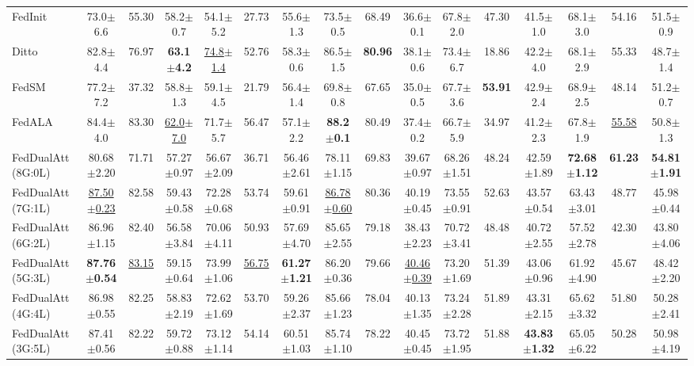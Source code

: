 \documentclass[a4paper]{article}
\begin{document}
\begin{table}[htbp]
\begin{adjustbox}{max width=\linewidth}
\begin{tabular}{l|ccc|ccc|ccc|ccc|ccc}
    FedInit & 73.0$\pm$6.6 & 55.30 & 58.2$\pm$0.7 & 54.1$\pm$5.2 & 27.73 & 55.6$\pm$1.3 & 73.5$\pm$0.5 & 68.49 & 36.6$\pm$0.1 & 67.8$\pm$2.0 & 47.30 & 41.5$\pm$1.0 & 68.1$\pm$3.0 & 54.16 & 51.5$\pm$0.9 \\
    Ditto   & 82.8$\pm$4.4 & 76.97 & \textbf{63.1$\pm$4.2} & \underline{74.8$\pm$1.4} & 52.76 & 58.3$\pm$0.6 & 86.5$\pm$1.5 & \textbf{80.96} & 38.1$\pm$0.6 & 73.4$\pm$6.7 & 18.86 & 42.2$\pm$4.0 & 68.1$\pm$2.9 & 55.33 & 48.7$\pm$1.4 \\
    FedSM   & 77.2$\pm$7.2 & 37.32 & 58.8$\pm$1.3 & 59.1$\pm$4.5 & 21.79 & 56.4$\pm$1.4 & 69.8$\pm$0.8 & 67.65 & 35.0$\pm$0.5 & 67.7$\pm$3.6 & \textbf{53.91} & 42.9$\pm$2.4 & 68.9$\pm$2.5 & 48.14 & 51.2$\pm$0.7 \\
    FedALA  & 84.4$\pm$4.0 & 83.30 & \underline{62.0$\pm$7.0} & 71.7$\pm$5.7 & 56.47 & 57.1$\pm$2.2 & \textbf{88.2$\pm$0.1} & 80.49 & 37.4$\pm$0.2 & 66.7$\pm$5.9 & 34.97 & 41.2$\pm$2.3 & 67.8$\pm$1.9 & \underline{55.58} & 50.8$\pm$1.3 \\
    \midrule
    FedDualAtt (8G:0L) & 80.68$\pm$2.20 & 71.71 & 57.27$\pm$0.97 & 56.67$\pm$2.09 & 36.71 & 56.46$\pm$2.61 & 78.11$\pm$1.15 & 69.83 & 39.67$\pm$0.97 & 68.26$\pm$1.51 & 48.24 & 42.59$\pm$1.89 & \textbf{72.68$\pm$1.12} & \textbf{61.23} & \textbf{54.81$\pm$1.91} \\
    FedDualAtt (7G:1L) & \underline{87.50$\pm$0.23} & 82.58 & 59.43$\pm$0.58 & 72.28$\pm$0.68 & 53.74 & 59.61$\pm$0.91 & \underline{86.78$\pm$0.60} & 80.36 & 40.19$\pm$0.45 & 73.55$\pm$0.91 & 52.63 & 43.57$\pm$0.54 & 63.43$\pm$3.01 & 48.77 & 45.98$\pm$0.44 \\
    FedDualAtt (6G:2L) & 86.96$\pm$1.15 & 82.40 & 56.58$\pm$3.84 & 70.06$\pm$4.11 & 50.93 & 57.69$\pm$4.70 & 85.65$\pm$2.55 & 79.18 & 38.43$\pm$2.23 & 70.72$\pm$3.41 & 48.48 & 40.72$\pm$2.55 & 57.52$\pm$2.78 & 42.30 & 43.80$\pm$4.06 \\
    FedDualAtt (5G:3L) & \textbf{87.76$\pm$0.54} & \underline{83.15} & 59.15$\pm$0.64 & 73.99$\pm$1.06 & \underline{56.75} & \textbf{61.27$\pm$1.21} & 86.20$\pm$0.36 & 79.66 & \underline{40.46$\pm$0.39} & 73.20$\pm$1.69 & 51.39 & 43.06$\pm$0.96 & 61.92$\pm$4.90 & 45.67 & 48.42$\pm$2.20 \\
    FedDualAtt (4G:4L) & 86.98$\pm$0.55 & 82.25 & 58.83$\pm$2.19 & 72.62$\pm$1.69 & 53.70 & 59.26$\pm$2.37 & 85.66$\pm$1.23 & 78.04 & 40.13$\pm$1.35 & 73.24$\pm$2.28 & 51.89 & 43.31$\pm$2.15 & 65.62$\pm$3.32 & 51.80 & 50.28$\pm$2.41 \\
    FedDualAtt (3G:5L) & 87.41$\pm$0.56 & 82.22 & 59.72$\pm$0.88 & 73.12$\pm$1.14 & 54.14 & 60.51$\pm$1.03 & 85.74$\pm$1.10 & 78.22 & 40.45$\pm$0.45 & 73.72$\pm$1.95 & 51.88 & \textbf{43.83$\pm$1.32} & 65.05$\pm$6.22 & 50.28 & 50.98$\pm$4.19 \\

\end{tabular}
\end{adjustbox}
\end{table}
\end{document}
